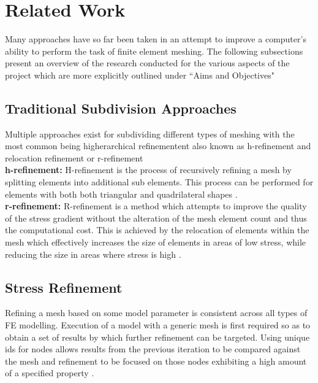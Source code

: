 \section{Related Work}
Many approaches have so far been taken in an attempt to improve a computer's ability to perform the task of finite element meshing. The following subsections present an overview of the research conducted for the various aspects of the project which are more explicitly outlined under ``Aims and Objectives"

\subsection{Traditional Subdivision Approaches}
Multiple approaches exist for subdividing different types of meshing with the most common being higherarchical refinementent also known as h-refinement and relocation refinement or r-refinement\cite{HandPRefinements} \cite{RRefinement}\\ 

\noindent
\textbf{h-refinement: }
H-refinement is the process of recursively refining a mesh by splitting elements into additional sub elements. This process can be performed for elements with both both triangular and quadrilateral shapes \cite{HandPRefinements}. \\ 

\noindent
\textbf{r-refinement: }
R-refinement is a method which attempts to improve the quality of the stress gradient without the alteration of the mesh element count and thus the computational cost. This is achieved by the relocation of elements within the mesh which effectively increases the size of elements in areas of low stress, while reducing the size in areas where stress is high \cite{RRefinement}.


\subsection{Stress Refinement}
Refining a mesh based on some model parameter is consistent across all types of FE modelling. Execution of a model with a generic mesh is first required so as to obtain a set of results by which further refinement can be targeted. Using unique ids for nodes allows results from the previous iteration to be compared against the mesh and refinement to be focused on those nodes exhibiting a high amount of a specified property \cite{FiniteElementMeshRefinement}.




